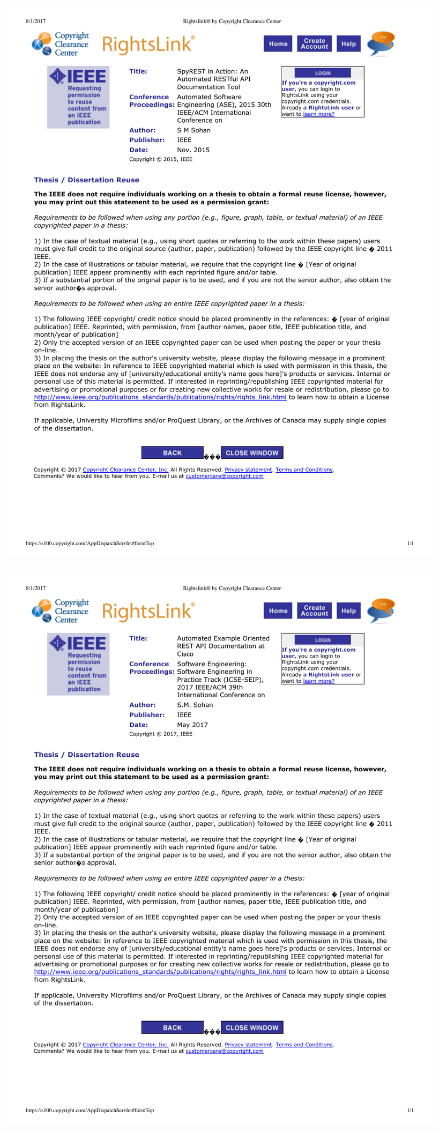 \begin{figure}
 \centering
 \includegraphics[width=\textwidth]{copyrights/tool.pdf}
\end{figure}
\begin{figure}
 \centering
 \includegraphics[width=\textwidth]{copyrights/cisco_paper.pdf}
\end{figure}
